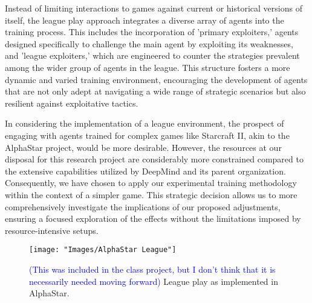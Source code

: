 \documentclass[journal]{IEEEtran}
\begin{document}
	Instead of limiting interactions to games against current or historical versions of itself, 
	the league play approach integrates a diverse array of agents into the training process. 
	This includes the incorporation of 'primary exploiters,' agents designed specifically to challenge the main agent by exploiting its weaknesses, 
	and 'league exploiters,' which are engineered to counter the strategies prevalent among the wider group of agents in the league. 
	This structure fosters a more dynamic and varied training environment, 
	encouraging the development of agents that are not only adept at navigating a wide range of strategic scenarios but also resilient against exploitative tactics.
	
	In considering the implementation of a league environment, the prospect of engaging with agents trained for complex games like Starcraft II, 
	akin to the AlphaStar project, would be more desirable. 
	However, the resources at our disposal for this research project are considerably more constrained compared to the 
	extensive capabilities utilized by DeepMind and its parent organization. 
	Consequently, we have chosen to apply our experimental training methodology within the context of a simpler game. 
	This strategic decision allows us to more comprehensively investigate the implications of our proposed adjustments, 
	ensuring a focused exploration of the effects without the limitations imposed by resource-intensive setups.
	
	\begin{figure}
		\centering
		\texttt{[image: "Images/AlphaStar League"]}
		\caption{\textcolor{blue}{(This was included in the class project, but I don't think that it is necessarily needed moving forward)} League play as implemented in AlphaStar.}
		\label{fig:alphastar-league}
	\end{figure}
	
	\begin{comment}		
	\end{comment}
\end{document}
